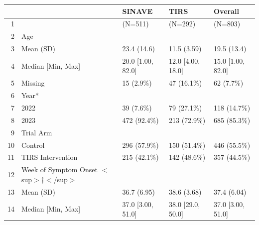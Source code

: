 \begin{table}[ht]
\centering
\begin{tabular}{rllll}
  \hline
 &   & SINAVE & TIRS & Overall \\ 
  \hline
1 &  & (N=511) & (N=292) & (N=803) \\ 
  2 & Age &  &  &  \\ 
  3 &   Mean (SD) & 23.4 (14.6) & 11.5 (3.59) & 19.5 (13.4) \\ 
  4 &   Median [Min, Max] & 20.0 [1.00, 82.0] & 12.0 [4.00, 18.0] & 15.0 [1.00, 82.0] \\ 
  5 &   Missing & 15 (2.9\%) & 47 (16.1\%) & 62 (7.7\%) \\ 
  6 & Year* &  &  &  \\ 
  7 &   2022 & 39 (7.6\%) & 79 (27.1\%) & 118 (14.7\%) \\ 
  8 &   2023 & 472 (92.4\%) & 213 (72.9\%) & 685 (85.3\%) \\ 
  9 & Trial Arm &  &  &  \\ 
  10 &   Control & 296 (57.9\%) & 150 (51.4\%) & 446 (55.5\%) \\ 
  11 &   TIRS Intervention & 215 (42.1\%) & 142 (48.6\%) & 357 (44.5\%) \\ 
  12 & Week of Symptom Onset $<$sup$>$†$<$/sup$>$ &  &  &  \\ 
  13 &   Mean (SD) & 36.7 (6.95) & 38.6 (3.68) & 37.4 (6.04) \\ 
  14 &   Median [Min, Max] & 37.0 [3.00, 51.0] & 38.0 [29.0, 50.0] & 37.0 [3.00, 51.0] \\ 
   \hline
\end{tabular}
\end{table}

